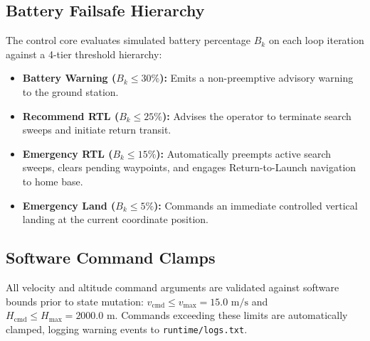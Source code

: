 \subsection{Battery Failsafe Hierarchy}
The control core evaluates simulated battery percentage $B_k$ on each loop iteration against a 4-tier threshold hierarchy:
\begin{itemize}
    \item \textbf{Battery Warning ($B_k \le 30\%$):} Emits a non-preemptive advisory warning to the ground station.
    \item \textbf{Recommend RTL ($B_k \le 25\%$):} Advises the operator to terminate search sweeps and initiate return transit.
    \item \textbf{Emergency RTL ($B_k \le 15\%$):} Automatically preempts active search sweeps, clears pending waypoints, and engages Return-to-Launch navigation to home base.
    \item \textbf{Emergency Land ($B_k \le 5\%$):} Commands an immediate controlled vertical landing at the current coordinate position.
\end{itemize}

\subsection{Software Command Clamps}
All velocity and altitude command arguments are validated against software bounds prior to state mutation: $v_{\mathrm{cmd}} \le v_{\max} = 15.0\text{ m/s}$ and $H_{\mathrm{cmd}} \le H_{\max} = 2000.0\text{ m}$. Commands exceeding these limits are automatically clamped, logging warning events to \texttt{runtime/logs.txt}.
